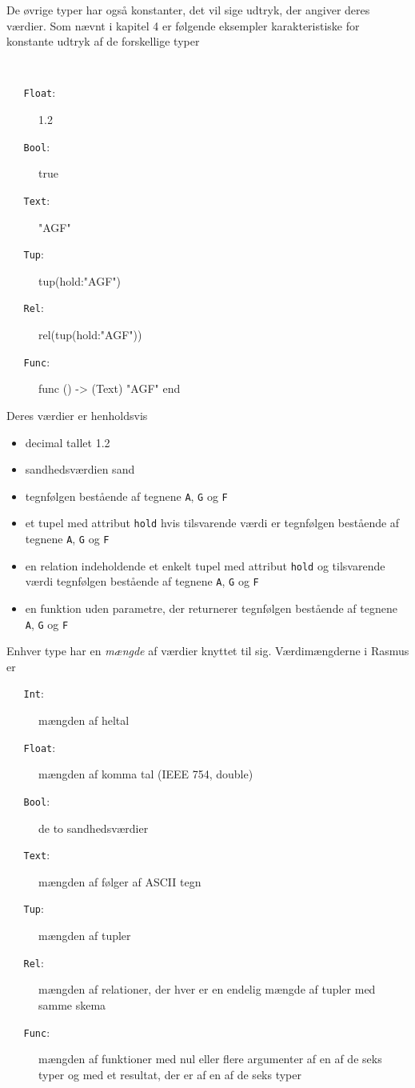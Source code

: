 De \o{}vrige typer har ogs\aa{} konstanter, det vil sige udtryk,
der angiver deres v\ae{}rdier. Som n\ae{}vnt i kapitel 4 er
f\o{}lgende eksempler karakteristiske for konstante udtryk af de
forskellige typer
{\tt
  \begin{description}%
  \item[{\tt ~~~Float}:] 1.2
\item[{\tt ~~~Bool}:] true 
\item[{\tt ~~~Text}:] "AGF"
\item[{\tt ~~~Tup}:] tup(hold:"AGF")
\item[{\tt ~~~Rel}:] rel(tup(hold:"AGF"))
\item[{\tt ~~~Func}:] func () -> (Text) "AGF" end
\end{description}
}
Deres v\ae{}rdier er henholdsvis
\begin{itemize}
\item decimal tallet 1.2
\item sandhedsv\ae{}rdien sand
\item tegnf\o{}lgen best\aa{}ende af tegnene \verb"A", \verb"G" og \verb"F"
\item et tupel med attribut \verb"hold" hvis tilsvar\-en\-de v\ae{}rdi er
tegnf\o{}lgen best\aa{}\-en\-de af tegnene \verb"A", \verb"G" og \verb"F"
\item en relation indeholdende et enkelt tupel med attribut \verb"hold" og
til\-svar\-en\-de v\ae{}rdi
tegnf\o{}lgen best\aa{}ende af tegnene \verb"A", \verb"G" og \verb"F"
\item en funktion uden parametre, der returnerer tegnf\o{}lgen best\aa{}\-en\-de 
af tegnene \verb"A", \verb"G" og \verb"F"
\end{itemize}
Enhver type har en {\em m\ae{}ngde\/} af v\ae{}rdier knyttet til sig.
V\ae{}rdim\ae{}ngderne i {\sc Rasmus} er
\begin{description}%
\item[{\tt ~~~Int}:] m\ae{}ngden af heltal
\item[{\tt ~~~Float}:] m\ae{}ngden af komma tal (IEEE 754, double)
\item[{\tt ~~~Bool}:] de to sandhedsv\ae{}rdier
\item[{\tt ~~~Text}:] m\ae{}ngden af f\o{}lger af ASCII tegn
\item[{\tt ~~~Tup}:] m\ae{}ngden af tupler
\item[{\tt ~~~Rel}:] m\ae{}ngden af relationer, der hver er en endelig
m\ae{}ngde af tupler med samme skema
\item[{\tt ~~~Func}:] m\ae{}ngden af funktioner med nul eller flere
argumenter af en af de seks typer og med et resultat, der er af en af de seks
typer
\end{description}
